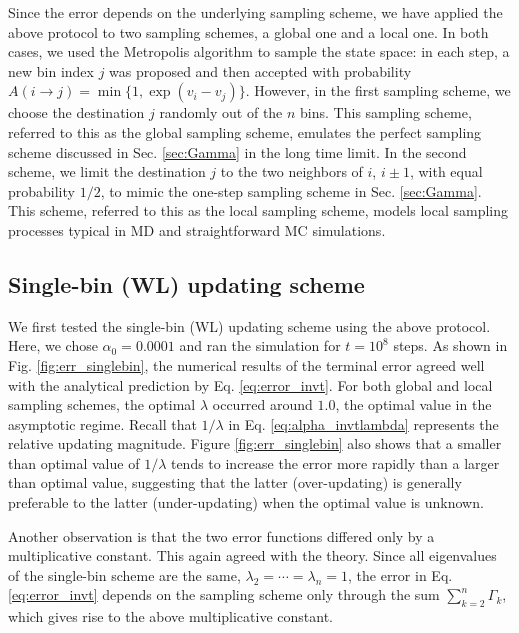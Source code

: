 \documentclass[reprint, floatfix]{revtex4-1}
\begin{document}
Since the error depends on the underlying sampling scheme,
we have applied the above protocol to two
sampling schemes,
a global one and a local one.
%
In both cases, we used the
Metropolis algorithm\cite{metropolis1953, newman, frenkel, landau_binder}
to sample the state space:
%
in each step, a new bin index $j$ was proposed
and then accepted with probability
%
$
A(i \to j) = \min\{ 1, \exp(v_i - v_j) \}.
$
However,
in the first sampling scheme,
we choose the destination $j$
randomly out of the $n$ bins.
%
This sampling scheme,
referred to this as the global sampling scheme,
emulates the perfect sampling scheme
discussed in Sec. \ref{sec:Gamma}
in the long time limit.
%
In the second scheme,
we limit the destination $j$
to the two neighbors of $i$,
$i \pm 1$, with equal probability $1/2$,
to mimic the one-step sampling scheme
in Sec. \ref{sec:Gamma}.
%
This scheme,
referred to this as the local sampling scheme,
models local sampling processes
typical in MD and straightforward MC simulations.
%



\subsection{Single-bin (WL) updating scheme}



We first tested the single-bin (WL) updating scheme
using the above protocol.
%
Here, we chose $\alpha_0 = 0.0001$
and ran the simulation for $t = 10^8$ steps.
%
As shown in Fig. \ref{fig:err_singlebin},
the numerical results of the terminal error agreed well with
the analytical prediction by Eq. \eqref{eq:error_invt}.
%
For both global and local sampling schemes,
the optimal $\lambda$ occurred around $1.0$,
the optimal value in the asymptotic regime.
%
Recall that $1/\lambda$ in Eq. \eqref{eq:alpha_invtlambda}
represents the relative updating magnitude.
%
Figure \ref{fig:err_singlebin} also shows that
a smaller than optimal value of $1/\lambda$
tends to increase the error more rapidly
than a larger than optimal value,
suggesting that the latter (over-updating)
is generally preferable to the latter (under-updating)
when the optimal value is unknown.


Another observation is that the two error functions
differed only by a multiplicative constant.
%
This again agreed with the theory.
%
Since all eigenvalues of the single-bin scheme are
the same, $\lambda_2 = \cdots = \lambda_n = 1$,
the error in Eq. \eqref{eq:error_invt}
depends on the sampling scheme only through
the sum $\sum_{ k = 2 }^n \Gamma_k$,
which gives rise to the above multiplicative constant.
\end{document}
